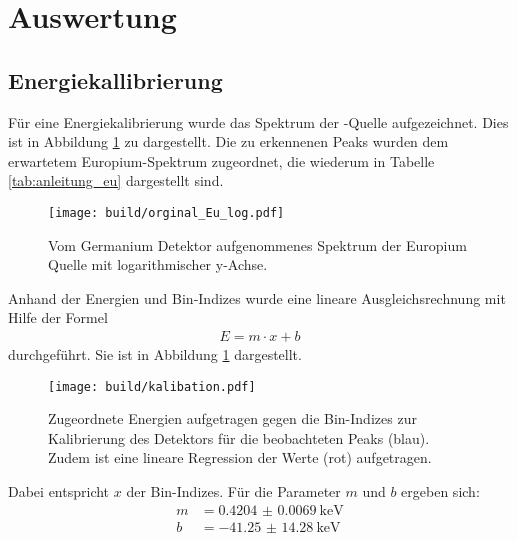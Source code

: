 \newpage
\section{Auswertung}
\label{sec:Auswertung}

\subsection{Energiekallibrierung}
\label{sec:Energiekallibrierung}

Für eine Energiekalibrierung wurde das Spektrum der -Quelle
aufgezeichnet. Dies ist in Abbildung \ref{plt:Eu-Spektrum} zu dargestellt. Die zu
erkennenen Peaks wurden dem erwartetem Europium-Spektrum zugeordnet,
die wiederum in Tabelle \ref{tab:anleitung_eu} dargestellt sind.
\begin{figure}[htb]
    \centering
    \texttt{[image: build/orginal\_Eu\_log.pdf]}
  \caption{Vom Germanium Detektor aufgenommenes Spektrum der Europium Quelle mit
  logarithmischer y-Achse.}
  \label{plt:Eu-Spektrum}
\end{figure}
Anhand der Energien und Bin-Indizes wurde eine lineare Ausgleichsrechnung
mit Hilfe der Formel
\begin{align*}
  E = m \cdot x + b
\end{align*}
durchgeführt. Sie ist in Abbildung \ref{plt:Eu-Spektrum} dargestellt.
\begin{figure}[htb]
  \centering
  \texttt{[image: build/kalibation.pdf]}
  \caption{Zugeordnete Energien aufgetragen gegen die Bin-Indizes zur
  Kalibrierung des Detektors für die beobachteten Peaks (blau). Zudem ist eine
  lineare Regression der Werte (rot) aufgetragen.}
  \label{plt:eichung}
\end{figure}
Dabei entspricht $x$ der Bin-Indizes. Für die Parameter $m$ und
$b$ ergeben sich:
\begin{align*}
	m &= \SI{0.4204(69)}{\kilo\electronvolt} \\
  b &= \SI{-41.25(1428)}{\kilo\electronvolt}
\end{align*}
\FloatBarrier

